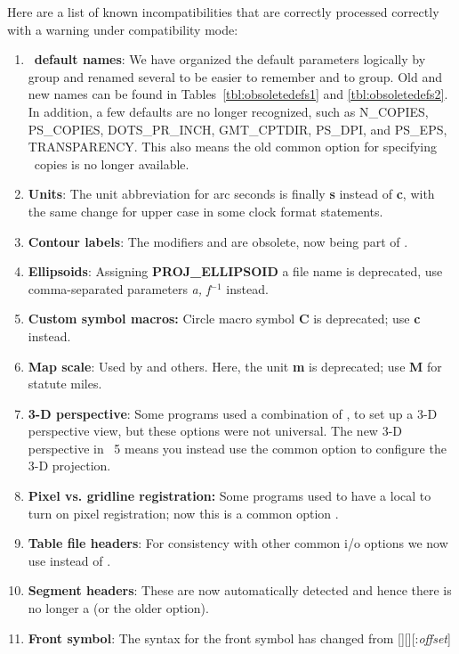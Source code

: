 Here are a list of known incompatibilities that are correctly processed correctly with a warning under
compatibility mode:
\begin{enumerate}
	\item \gmt\ {\bf default names}: We have organized the default parameters logically by group and
		renamed several to be easier to remember and to group.  Old and new names can be
		found in Tables~\ref{tbl:obsoletedefs1} and \ref{tbl:obsoletedefs2}.  In addition, a few defaults are no longer
		recognized, such as N\_COPIES, PS\_COPIES, DOTS\_PR\_INCH, GMT\_CPTDIR, PS\_DPI, and PS\_EPS, TRANSPARENCY.
		This also means the old common option  for specifying \PS\ copies is no longer available.
	\item {\bf Units}: The unit abbreviation for arc seconds is finally {\bf s} instead of {\bf c},
		with the same change for upper case in some clock format statements.
	\item {\bf Contour labels}: The modifiers  and  are obsolete, now being part of .
	\item {\bf Ellipsoids}: Assigning {\bf PROJ\_ELLIPSOID} a file name is deprecated, use comma-separated parameters {\it a, f$^{-1}$} instead.
	\item {\bf Custom symbol macros:} Circle macro symbol {\bf C} is deprecated; use {\bf c} instead.
	\item {\bf Map scale}: Used by  and others.  Here, the unit {\bf m} is deprecated; use {\bf M} for statute miles.
	\item {\bf 3-D perspective}: Some programs used a combination of ,  to set up a 3-D perspective
		view, but these options were not universal.  The new 3-D perspective in \gmt\ 5 means you
		instead use the common option  to configure the 3-D projection.
	\item {\bf Pixel vs. gridline registration:} Some programs used to have a local  to turn on pixel registration;
		now this is a common option .
	\item {\bf Table file headers}: For consistency with other common i/o options we now use  instead of .
	\item {\bf Segment headers}: These are now automatically detected and hence there is no longer a  (or the older  option).
	\item {\bf Front symbol}: The syntax for the front symbol has changed from [][][:{\it offset}]

\end{enumerate}
